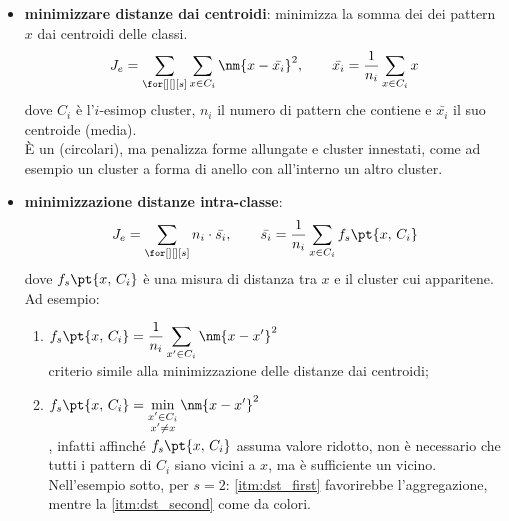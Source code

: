 \begin{itemize}
    \item \textbf{minimizzare distanze dai centroidi}: minimizza la somma dei  dei pattern $x$ dai centroidi delle classi.
        \[
            J_e = \sum_{\for[][][s]}\sum_{x \in C_i}{\nm{x - \bar{x_i}}^2}, \qquad \bar{x_i} = \frac{1}{n_i}\sum_{x \in C_i}{x}
        \]
        dove $C_i$ è l'$i$-esimop cluster, $n_i$ il numero di pattern che contiene e $\bar{x_i}$ il suo centroide (media).
        \\
        È un  (circolari), ma penalizza forme allungate e cluster innestati, come ad esempio un cluster a forma di anello con all'interno un altro cluster.
    \item \textbf{minimizzazione distanze intra-classe}:
        \[
            J_e = \sum_{\for[][][s]}{n_i\cdot \bar{s_i}}, \qquad \bar{s_i} = \frac{1}{n_i}\sum_{x \in C_i}{f_s\pt{x,\,C_i}}
        \]
        dove $f_s\pt{x,\,C_i}$ è una misura di distanza tra $x$ e il cluster cui apparitene.
        Ad esempio:
        \begin{enumerate}[ref=\textbf{(\arabic*)}]
            \item \label{itm:dst_first} $f_s\pt{x,\,C_i} = \dfrac{1}{n_i}\displaystyle\sum_{x'\in C_i}{\nm{x- x'}^2}$\\
                criterio simile alla minimizzazione delle distanze dai centroidi;
            \item \label{itm:dst_second} $f_s\pt{x,\,C_i} = \displaystyle\min_{\substack{x'\in C_i \\ x' \ne x}}{\nm{x-x'}^2}$\\
                , infatti affinché $f_s\pt{x,\,C_i}$ assuma valore ridotto, non è necessario che tutti i pattern di $C_i$ siano vicini a $x$, ma è sufficiente un vicino.
                Nell'esempio sotto, per $s = 2$: \ref{itm:dst_first} favorirebbe l'aggregazione, mentre la \ref{itm:dst_second} come da colori.
        \end{enumerate}
\end{itemize}
%
